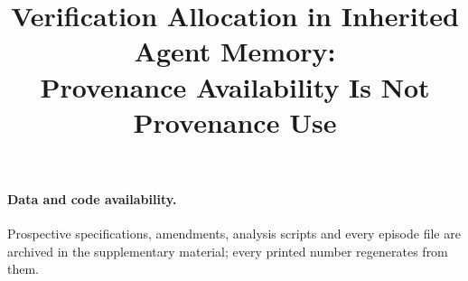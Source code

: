 \documentclass[10pt]{article}
\title{Verification Allocation in Inherited Agent Memory:\\
Provenance Availability Is Not Provenance Use}
\begin{document}
\maketitle

\begin{abstract}

\end{abstract}











\paragraph{Data and code availability.} Prospective specifications, amendments, analysis
scripts and every episode file are archived in the supplementary material;
every printed number regenerates from them.



\appendix





\end{document}
